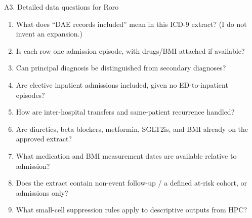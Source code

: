 \documentclass[aspectratio=169,10pt]{beamer}
\begin{document}
\begin{frame}{A3. Detailed data questions for Roro}
  \footnotesize
  \begin{enumerate}
    \item What does ``DAE records included'' mean in this ICD-9 extract? (I do not invent an expansion.)
    \item Is each row one admission episode, with drugs/BMI attached if available?
    \item Can principal diagnosis be distinguished from secondary diagnoses?
    \item Are elective inpatient admissions included, given no ED-to-inpatient episodes?
    \item How are inter-hospital transfers and same-patient recurrence handled?
    \item Are diuretics, beta blockers, metformin, SGLT2is, and BMI already on the approved extract?
    \item What medication and BMI measurement dates are available relative to admission?
    \item Does the extract contain non-event follow-up / a defined at-risk cohort, or admissions only?
    \item What small-cell suppression rules apply to descriptive outputs from HPC?
  \end{enumerate}
\end{frame}
\end{document}
